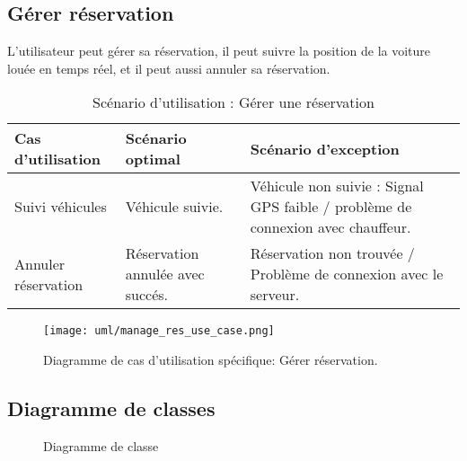 \subsection{Gérer réservation}
L'utilisateur peut gérer sa réservation, il peut suivre la position de la voiture louée en temps réel, et il peut aussi annuler sa réservation.
\begin{table}[H]
    \begin{center}
        \begin{tabularx}{\textwidth} {
                | >{\centering\arraybackslash}X
                | >{\centering\arraybackslash}X
                | >{\centering\arraybackslash}X |}
            \hline
            Cas d'utilisation   & Scénario optimal                 & Scénario d'exception                                                            \\
            \hline
            Suivi véhicules     & Véhicule suivie.                 & Véhicule non suivie : Signal GPS faible / problème de connexion avec chauffeur. \\
            \hline
            Annuler réservation & Réservation annulée avec succés. & Réservation non trouvée / Problème de connexion avec le serveur.                \\
            \hline
        \end{tabularx}
        \captionsetup{justification=centering}
        \caption{Scénario d'utilisation : Gérer une réservation}
        \label{tab:manage_reservation_scenario}
    \end{center}
\end{table}
\begin{figure}[H]
    \centering
    \texttt{[image: uml/manage\_res\_use\_case.png]}
    \vspace{1cm}
    \captionsetup{justification=centering}
    \caption{Diagramme de cas d'utilisation spécifique: Gérer réservation.}
    \label{fig:use_case_manage_res}
\end{figure}


\subsection{Diagramme de classes}
\begin{figure}[H]
    \centering
    \vspace{1cm}
    \captionsetup{justification=centering}

    \caption{Diagramme de classe}
    \label{fig:class_diag}
\end{figure}
\clearpage
